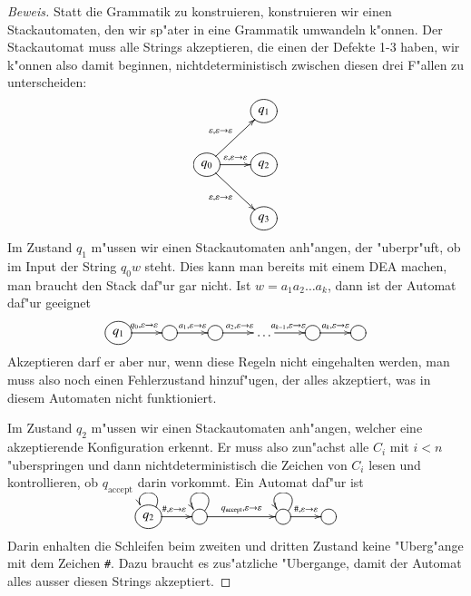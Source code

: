 \begin{proof}[Beweis]
Statt die Grammatik zu konstruieren, konstruieren wir einen Stackautomaten,
den wir sp"ater in eine Grammatik umwandeln k"onnen. Der Stackautomat
muss alle Strings akzeptieren, die einen der Defekte 1-3 haben, wir
k"onnen also damit beginnen, nichtdeterministisch zwischen diesen drei
F"allen zu unterscheiden:
\[
\entrymodifiers={++[o][F]}
\xymatrix{
*+\txt{}
	&q_1
\\
q_0	\ar[ur]^{\varepsilon,\varepsilon\to\varepsilon}
	\ar[r]^{\varepsilon,\varepsilon\to\varepsilon}
	\ar[dr]_{\varepsilon,\varepsilon\to\varepsilon}
	&q_2
\\
*+\txt{}
	&q_3
}
\]
Im Zustand $q_1$ m"ussen wir einen Stackautomaten anh"angen, der
"uberpr"uft, ob im Input der String $q_0w$ steht. Dies kann man 
bereits mit einem DEA machen, man braucht den Stack daf"ur gar nicht.
Ist $w=a_1a_2\dots a_k$, dann ist der Automat daf"ur geeignet
\[
\xymatrix{
*++[o][F]{q_1}\ar[r]^{q_0,\varepsilon\to\varepsilon}
	&*++[o][F]{}\ar[r]^{a_1,\varepsilon\to\varepsilon}
		&*++[o][F]{}\ar[r]^{a_2,\varepsilon\to\varepsilon}
			&\dots\ar[r]^{a_{k-1},\varepsilon\to\varepsilon}
				&*++[o][F]{}\ar[r]^{a_k,\varepsilon\to\varepsilon}
					&*++[o][F]{}
}
\]
Akzeptieren darf er aber nur, wenn diese Regeln nicht eingehalten
werden, man muss also noch einen Fehlerzustand hinzuf"ugen, der
alles akzeptiert, was in diesem Automaten nicht funktioniert.

Im Zustand $q_2$ m"ussen wir einen Stackautomaten anh"angen, welcher
eine akzeptierende Konfiguration erkennt. Er muss also zun"achst 
alle $C_i$ mit $i<n$ "uberspringen und dann nichtdeterministisch
die Zeichen von $C_i$ lesen und kontrollieren, ob $q_{\text{accept}}$
darin vorkommt. Ein Automat daf"ur ist 
\[
\entrymodifiers={++[o][F]}
\xymatrix{
q_2\ar@(ur,ul)
	\ar[r]^{{\tt\#},\varepsilon\to\varepsilon}
	&{}\ar@(ur,ul)
		\ar[rr]^{q_{\text{accept}},\varepsilon\to\varepsilon}
		&*+\txt{}
			&{}\ar@(ur,ul)
				\ar[r]^{{\tt\#},\varepsilon\to\varepsilon}
				&*++[o][F]{}
}
\]
Darin enhalten die Schleifen beim zweiten und dritten Zustand keine
"Uberg"ange mit dem Zeichen {\tt\#}. Dazu braucht es zus"atzliche
"Ubergange, damit der Automat alles ausser diesen Strings akzeptiert.


\end{proof}
